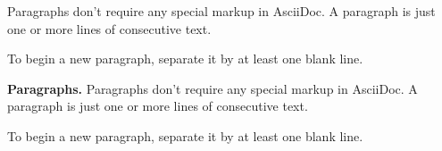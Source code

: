 Paragraphs don’t require any special markup in AsciiDoc.
A paragraph is just one or more lines of consecutive text.


To begin a new paragraph, separate it by at least one blank line.


{\bf Paragraphs.}
Paragraphs don’t require any special markup in AsciiDoc.
A paragraph is just one or more lines of consecutive text.


To begin a new paragraph, separate it by at least one blank line.




